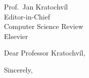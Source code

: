 \documentclass[11pt,a4paper]{letter}
\begin{document}
\begin{letter}{Prof.\ Jan Kratochvíl \\ Editor-in-Chief \\ Computer Science Review \\ Elsevier}

\opening{Dear Professor Kratochvíl,}


\closing{Sincerely,}

\end{letter}
\end{document}
